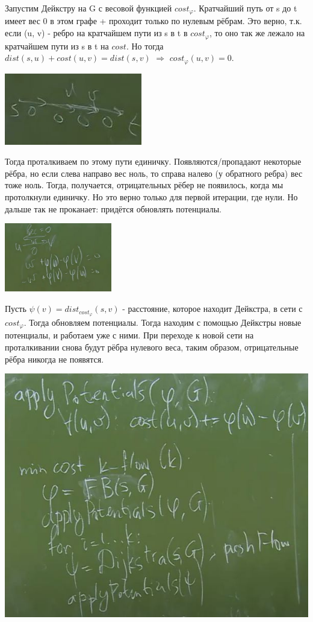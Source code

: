 Запустим Дейкстру на G с весовой функцией $cost_\varphi$. Кратчайший путь от s до t имеет вес 0 в этом графе + проходит только по нулевым рёбрам. Это верно, т.к. если (u, v) - ребро на кратчайшем пути из s в t в $cost_\varphi$, то оно так же лежало на кратчайшем пути из s в t на $cost$. Но тогда $dist(s, u) + cost(u, v) = dist(s, v)$ $\Rightarrow$ $cost_\varphi(u, v) = 0$.

\includegraphics[]{images/87-92_null_path0}

Тогда проталкиваем по этому пути единичку. Появляются/пропадают некоторые рёбра, но если слева направо вес ноль, то справа налево (у обратного ребра) вес тоже ноль. Тогда, получается, отрицательных рёбер не появилось, когда мы протолкнули единичку. Но это верно только для первой итерации, где нули. Но дальше так не проканает: придётся обновлять потенциалы.

\includegraphics[height=3cm]{images/87-92_null_path}

Пусть $\psi (v) = dist_{cost_\varphi}(s, v)$ - расстояние, которое находит Дейкстра, в сети с $cost_\varphi$. Тогда обновляем потенциалы. Тогда находим с помощью Дейкстры новые потенциалы, и работаем уже с ними. При переходе к новой сети на проталкивании снова будут рёбра нулевого веса, таким образом, отрицательные рёбра никогда не появятся.

\includegraphics[]{images/87-92_potentials}

